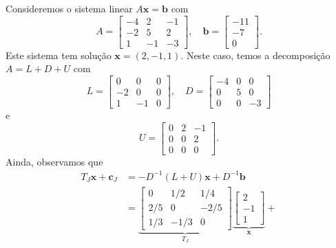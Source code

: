 \begin{ex}\label{ex:jacobi_intro}
  Consideremos o sistema linear $A\pmb{x} = \pmb{b}$ com
  \begin{equation}
    A =
    \begin{bmatrix}
      -4 & 2 & -1 \\
      -2 & 5 & 2 \\
       1 & -1 & -3
    \end{bmatrix},\quad
    \pmb{b} =
    \begin{bmatrix}
      -11\\ -7\\ 0
    \end{bmatrix}.
  \end{equation}
  Este sistema tem solução $\pmb{x} = (2, -1, 1)$. Neste caso, temos a decomposição $A = L + D + U$ com
  \begin{equation}
    L = \begin{bmatrix} 
      0 & 0 & 0 \\
      -2 & 0 & 0 \\
       1 & -1 & 0
     \end{bmatrix},\quad
    D = \begin{bmatrix}
      -4 & 0 & 0 \\
      0 & 5 & 0 \\
       0 & 0 & -3                  
     \end{bmatrix}
  \end{equation}
  e
  \begin{equation}
    U = \begin{bmatrix}
      0 & 2 & -1 \\
      0 & 0 & 2 \\
       0 & 0 & 0
    \end{bmatrix}.
  \end{equation}
  Ainda, observamos que
  \begin{align}
    T_J\pmb{x} + \pmb{c}_J &= -D^{-1}(L+U)\pmb{x} + D^{-1}\pmb{b}\\
    &= \underbrace{\begin{bmatrix}
        0 & 1/2 & 1/4 \\
        2/5 & 0 & -2/5 \\
        1/3 & -1/3 & 0
      \end{bmatrix}}_{T_J}
      \underbrace{\begin{bmatrix}
        2 \\
        -1 \\
        1             
      \end{bmatrix}}_{\pmb{x}} +

\end{align}
\end{ex}
